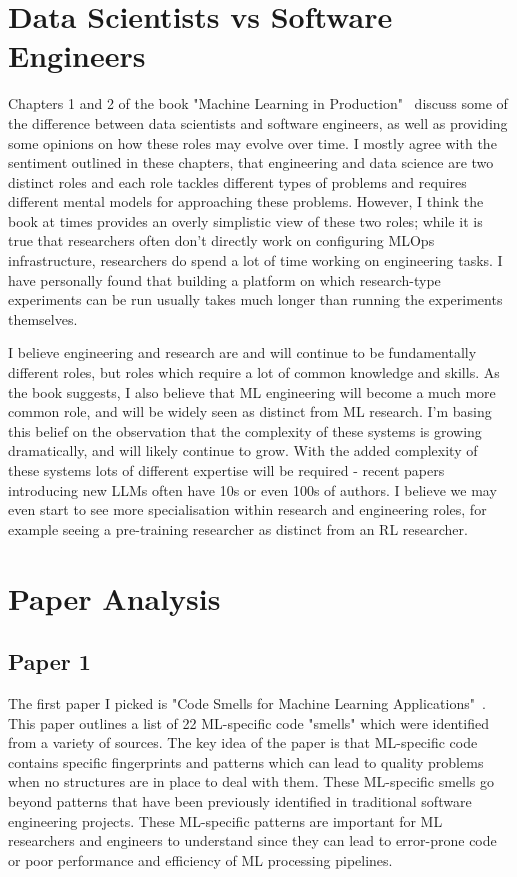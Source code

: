 \documentclass{article}
\begin{document}
\section{Data Scientists vs Software Engineers}

Chapters 1 and 2 of the book "Machine Learning in Production"~\cite{ml-prod} discuss some of the difference between data scientists and software engineers, as well as providing some opinions on how these roles may evolve over time. I mostly agree with the sentiment outlined in these chapters, that engineering and data science are two distinct roles and each role tackles different types of problems and requires different mental models for approaching these problems. However, I think the book at times provides an overly simplistic view of these two roles; while it is true that researchers often don't directly work on configuring MLOps infrastructure, researchers do spend a lot of time working on engineering tasks. I have personally found that building a platform on which research-type experiments can be run usually takes much longer than running the experiments themselves.

I believe engineering and research are and will continue to be fundamentally different roles, but roles which require a lot of common knowledge and skills. As the book suggests, I also believe that ML engineering will become a much more common role, and will be widely seen as distinct from ML research. I'm basing this belief on the observation that the complexity of these systems is growing dramatically, and will likely continue to grow. With the added complexity of these systems lots of different expertise will be required - recent papers introducing new LLMs often have 10s or even 100s of authors. I believe we may even start to see more specialisation within research and engineering roles, for example seeing a pre-training researcher as distinct from an RL researcher.


\section{Paper Analysis}

\subsection{Paper 1}

The first paper I picked is "Code Smells for Machine Learning Applications"~\cite{code-smells}. This paper outlines a list of 22 ML-specific code "smells" which were identified from a variety of sources. The key idea of the paper is that ML-specific code contains specific fingerprints and patterns which can lead to quality problems when no structures are in place to deal with them. These ML-specific smells go beyond patterns that have been previously identified in traditional software engineering projects. These ML-specific patterns are important for ML researchers and engineers to understand since they can lead to error-prone code or poor performance and efficiency of ML processing pipelines.
\end{document}

